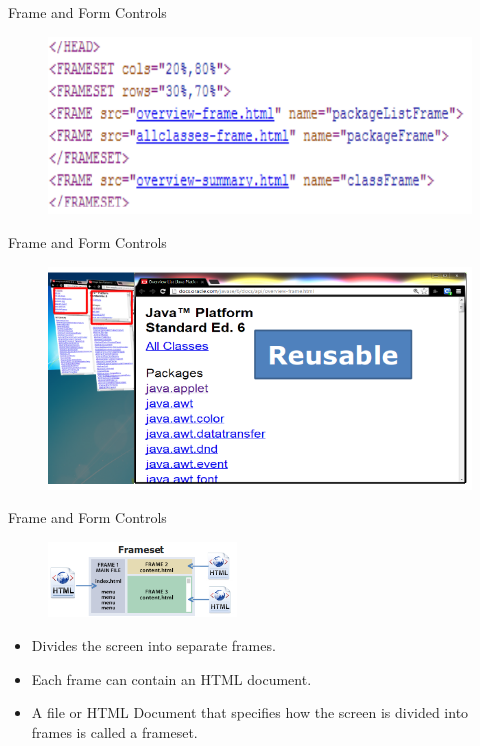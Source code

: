 \documentclass[14pt]{beamer}
\begin{document}
\begin{frame}{Frame and Form Controls}
\begin{figure}[H]
\centering
\includegraphics[scale=.5]{frame-form-control3.png}
\end{figure}
\end{frame}

\begin{frame}{Frame and Form Controls}
\begin{figure}[H]
\centering
\includegraphics[scale=.5]{frame-form-control4.png}
\end{figure}
\end{frame}

\begin{frame}{Frame and Form Controls}
\begin{figure}[H]
\centering
\includegraphics[width=5cm, height=2cm]{frameset.png}
\end{figure}
\begin{itemize}
 \item Divides the screen into separate frames.
 \item Each frame can contain an HTML document.
 \item A file or HTML Document that specifies how the screen is divided into frames is called a frameset.
\end{itemize}
\end{frame}
\end{document}
